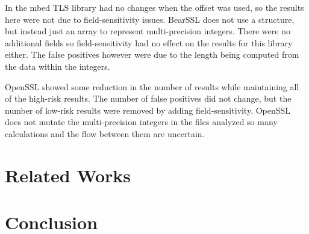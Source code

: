 \documentclass[11pt,a4paper]{article}
\begin{document}
 In the mbed TLS library had no changes when the offset was used, so the results
 here were not due to field-sensitivity issues. BearSSL does not use a structure,
 but instead just an array to represent multi-precision integers. There were no
 additional fields so field-sensitivity had no effect on the results for this
 library either. The false positives however were due to the length being
 computed from the data within the integers.

 OpenSSL showed some reduction in the number of results while maintaining all of
 the high-risk results. The number of false positives did not change, but the
 number of low-risk results were removed by adding field-sensitivity. OpenSSL
 does not mutate the multi-precision integers in the files analyzed so many
 calculations and the flow between them are uncertain. 


 
\section{Related Works}

\section{Conclusion}

{}

\end{document}
